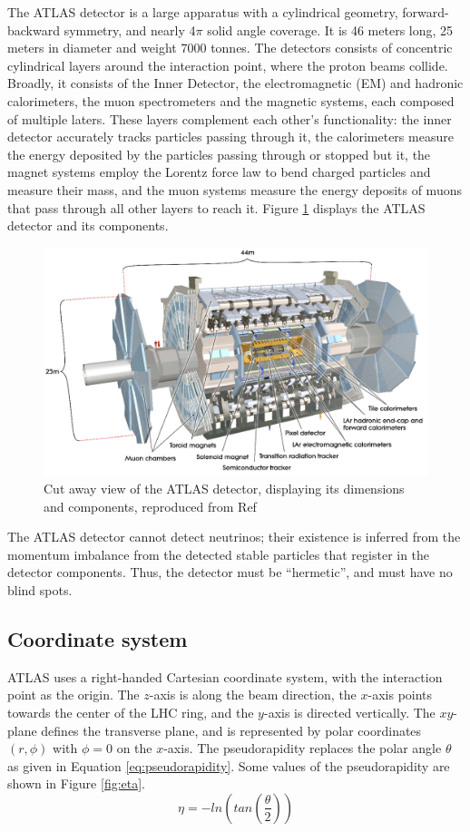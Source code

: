 \documentclass[11pt,a4paper,openright,twoside]{report}
\begin{document}
The ATLAS detector is a large apparatus with a cylindrical geometry, forward-backward symmetry, and nearly 4$\pi$ solid angle coverage. It is 46 meters long, 25 meters in diameter and weight 7000 tonnes. The detectors consists of concentric cylindrical layers around the interaction point, where the proton beams collide. Broadly, it consists of the  Inner Detector, the electromagnetic (EM) and hadronic calorimeters, the muon spectrometers and the magnetic systems, each composed of multiple laters. These layers complement each other's functionality: the inner detector accurately tracks particles passing through it, the calorimeters measure the energy deposited by the particles passing through or stopped but it, the magnet systems employ the Lorentz force law to bend charged particles and measure their mass, and the muon systems measure the energy deposits of muons that pass through all other layers to reach it. Figure \ref{fig:ATLAS} displays the ATLAS detector and its components.

\begin{figure}[h]
\centering
\includegraphics[width=\textwidth]{ATLAS.png}
\caption{Cut away view of the ATLAS detector, displaying its dimensions and components, reproduced from Ref \cite{ATLAS_detector}}
\label{fig:ATLAS}
\end{figure}

The ATLAS detector cannot detect neutrinos; their existence is inferred from the momentum imbalance from the detected stable particles that register in the detector components. Thus, the detector must be ``hermetic'', and must have no blind spots.

\subsection{Coordinate system}
ATLAS uses a right-handed Cartesian coordinate system, with the interaction point as the origin. The $z$-axis is along the beam direction, the $x$-axis points towards the center of the LHC ring, and the $y$-axis is directed vertically. The $xy$-plane defines the transverse plane, and is represented by polar coordinates $(r,\phi)$ with $\phi=0$ on the $x$-axis. The pseudorapidity replaces the polar angle $\theta$ as given in Equation \ref{eq:pseudorapidity}. Some values of the pseudorapidity are shown in Figure \ref{fig:eta}.
\begin{equation}
\eta = -ln\left(tan\left(\frac{\theta}{2}\right)\right)
\label{eq:pseudorapidity}
\end{equation}
\end{document}
